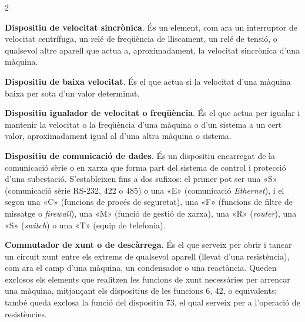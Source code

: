 \begin{multicols}{2}
\begin{list}{}
		\item[\textbf{13}]   
		\textbf{Dispositiu de velocitat sincrònica}. És un element, com ara un interruptor de
		velocitat centrífuga, un relé de freqüència de lliscament, un relé
		de tensió, o qualsevol altre aparell que actua a, aproximadament, la
		velocitat sincrònica d'una màquina.
		
		
		\item[\textbf{14}]   
		\textbf{Dispositiu de baixa velocitat}. És el que actua si la velocitat d'una màquina baixa per sota d'un valor determinat.
		
		\item[\textbf{15}]  
		\textbf{Dispositiu igualador de velocitat o freqüència}. És el que
		actua per igualar i mantenir la velocitat o la  freqüència
		d'una màquina o d'un sistema a un cert valor, aproximadament igual
		al  d'una altra màquina o sistema.
		
		\item[\textbf{16}]  
		\textbf{Dispositiu de comunicació de dades}. És un dispositiu encarregat de la comunicació sèrie o en xarxa que forma part del  sistema de control i protecció d'una subestació. S'estableixen fins a dos sufixos: el primer pot ser una «S» (comunicació sèrie RS-232, 422 o 485) o una «E» (comunicació \textit{Ethernet}), i el segon una «C» (funcions de procés de seguretat), una «F» (funcions de filtre de missatge o \textit{firewall}), una «M» (funció de gestió de xarxa), una  «R» (\textit{router}), una «S» (\textit{switch}) o una «T» (equip de telefonia).
		
		\item[\textbf{17}]   
		  
		\textbf{Commutador de  xunt o de descàrrega}. És el que serveix per obrir i tancar
		un circuit xunt entre els extrems de qualsevol aparell (llevat d'una resistència), com ara el camp d'una màquina, un condensador o
		una reactància. Queden exclosos els elements que realitzen les
		funcions de xunt necessàries per arrencar una màquina, mitjançant
		els dispositius de les funcions 6, 42, o equivalents; també queda exclosa la funció
		del dispositiu 73, el qual serveix per a l'operació de resistències.
		

\end{list}
\end{multicols}
